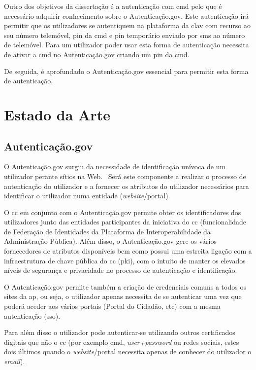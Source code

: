 Outro dos objetivos da dissertação é a autenticação com \acrfull{cmd} pelo que é necessário adquirir conhecimento sobre o Autenticação.gov.
Este autenticação irá permitir que os utilizadores se autentiquem na plataforma da \acrshort{clav} com recurso ao seu número telemóvel,
\acrshort{pin} da \acrshort{cmd} e \acrshort{pin} temporário enviado por \acrshort{sms} ao número de telemóvel. Para um utilizador poder
usar esta forma de autenticação necessita de ativar a \acrshort{cmd} no Autenticação.gov criando um \acrshort{pin} da \acrshort{cmd}.

De seguida, é aprofundado o Autenticação.gov essencial para permitir esta forma de autenticação.

\section{Estado da Arte}

\subsection{Autenticação.gov}
O Autenticação.gov surgiu da necessidade de identificação unívoca de um utilizador perante sítios na 
Web.~\cite{agov} Será este componente a realizar o processo de autenticação do utilizador e a fornecer
 os atributos do utilizador necessários para identificar o utilizador numa entidade (\textit{website}/portal).

O \acrshort{cc} em conjunto com o Autenticação.gov permite obter os identificadores dos utilizadores junto das 
entidades participantes da iniciativa do \acrshort{cc} (funcionalidade de Federação de Identidades da Plataforma 
de Interoperabilidade da Administração Pública). Além disso, o Autenticação.gov gere os vários fornecedores de 
atributos disponíveis bem como possui uma estreita ligação com a infraestrutura de chave pública do \acrlong{cc} 
(\acrfull{pki}), com o intuito de manter os elevados níveis de segurança e privacidade no processo de autenticação 
e identificação.~\cite{agov}

O Autenticação.gov permite também a criação de credenciais comuns a todos os sites da \acrshort{ap}, ou seja, 
o utilizador apenas necessita de se autenticar uma vez que poderá aceder aos vários portais (Portal do Cidadão, 
etc) com a mesma autenticação (\acrshort{sso}).

Para além disso o utilizador pode autenticar-se utilizando outros certificados digitais que não o \acrshort{cc} 
(por exemplo \acrfull{cmd}, \textit{user+password} ou redes sociais, estes dois últimos quando o 
\textit{website}/portal necessita apenas de conhecer do utilizador o \textit{email}).

